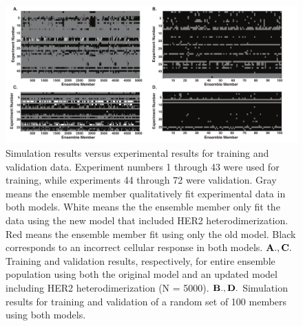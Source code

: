\documentclass[12pt]{article}
\begin{document}
\begin{figure}\centering
\includegraphics[width=1.0\textwidth]{./figs/Fig_3_ColorPlot.pdf}
\caption{Simulation results versus experimental results for training and validation data. Experiment numbers 1 through 43 were used for training, while experiments 44 through 72 were validation. Gray means the ensemble member qualitatively fit experimental data in both models. White means the the ensemble member only fit the data using the new model that included HER2 heterodimerization. Red means the ensemble member fit using only the old model. Black corresponds to an incorrect cellular response in both models.   $\bf{A.,C.}$ Training and validation results, respectively, for entire ensemble population using both the original model and an updated model including HER2 heterodimerization (N = 5000). $\bf{B.,D.}$ Simulation results for training and validation of a random set of 100 members using both models. 
 }
\label{fg:ColorPlot}
\end{figure}

\clearpage
\end{document}
